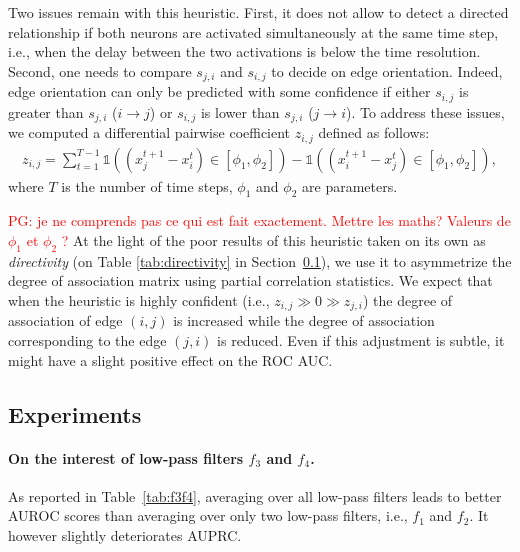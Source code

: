 \documentclass[wcp]{jmlr}
\begin{document}
Two issues remain with this heuristic. First, it does not allow to detect a
directed relationship if both neurons are activated simultaneously at the same
time step, i.e., when the delay between the two activations is below the time
resolution. Second, one needs to compare $s_{j,i}$ and $s_{i,j}$ to decide on
edge orientation. Indeed, edge orientation can only be predicted with some
confidence if either $s_{i,j}$ is greater than $s_{j,i}$ ($i\rightarrow j$) or
$s_{i,j}$ is lower than $s_{j,i}$ ($j\rightarrow i$). To address these issues,
we computed a differential pairwise coefficient $z_{i,j}$ defined as follows:
\begin{align}
z_{i,j} = \sum_{t=1}^{T - 1}
    \mathbb{1}((x_j^{t+1} - x_i^t) \in \left[\phi_1, \phi_2 \right]) -
    \mathbb{1}((x_i^{t+1} - x_j^t) \in \left[\phi_1, \phi_2 \right]),
\end{align}
where $T$ is the number of time steps, $\phi_1$ and $\phi_2$ are parameters.

\textcolor{red}{PG: je ne comprends pas ce qui est fait exactement. Mettre les
  maths? Valeurs de $\phi_1$ et $\phi_2$ ?} At the light of the poor results of this heuristic taken on its own as
\textit{directivity}
(on Table \ref{tab:directivity} in Section~\ref{sapp:results}), we use it to asymmetrize the degree of association
matrix using partial correlation statistics. We expect that when the heuristic
is highly confident (i.e., $z_{i,j} \gg 0 \gg z_{j,i}$) the degree of
association of edge $(i,j)$ is increased while the degree of association
corresponding to the edge $(j,i)$ is reduced. Even if this adjustment is
subtle, it might have a slight positive effect on the ROC AUC.



\subsection{Experiments}
\label{sapp:results}

\paragraph{On the interest of low-pass filters $f_3$ and $f_4$.}




As reported in Table~\ref{tab:f3f4}, averaging over all low-pass filters leads
to better AUROC scores than averaging over only two low-pass filters, i.e., $f_1$ and
$f_2$. It however slightly deteriorates AUPRC.
\end{document}
